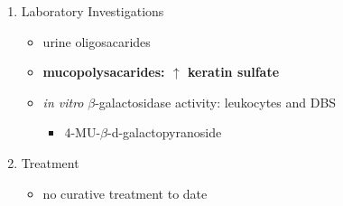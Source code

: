 \documentclass{scrartcl}
\begin{document}
\begin{enumerate}
\item Laboratory Investigations
\label{sec:orgccee3c6}
\begin{itemize}
\item urine oligosacarides
\item \textbf{mucopolysacarides: \(\uparrow\) keratin sulfate}
\item \emph{in vitro} \(\beta\)-galactosidase activity: leukocytes and DBS
\begin{itemize}
\item 4-MU-\(\beta\)-d-galactopyranoside
\end{itemize}
\end{itemize}

\item Treatment
\label{sec:org1651a49}
\begin{itemize}
\item no curative treatment to date
\end{itemize}
\end{enumerate}
\end{document}
